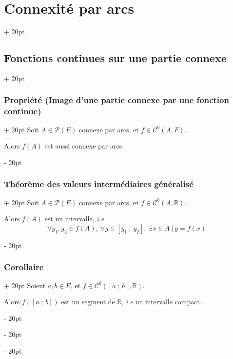 \documentclass[a4paper, 12pt, twoside]{article}
\newcommand{\R}{\mathbb{R}} %
\newcommand{\seg}[2]{\left[ #1\ ;\ #2 \right]}
\newcommand{\lr}[1]{\left( #1 \right)}
\newcommand{\ind}[1][20pt]{\advance\leftskip + #1}
\newcommand{\deind}[1][20pt]{\advance\leftskip - #1}
\newenvironment{indt}[2][20pt]{#2 \par \ind[#1]}{\par \deind} %
\begin{document}
\begin{indt}{\section{Connexité par arcs}}
        \vspace{12pt}
        
        \begin{indt}{\subsection{Fonctions continues sur une partie connexe}}
            \begin{indt}{\subsubsection{Propriété (Image d'une partie connexe par une fonction continue)}}
                Soit $A \in \mathcal P(E)$ connexe par arcs, et $f \in \mathcal C^0(A, F)$.

                \vspace{6pt}
                
                Alors $f(A)$ est aussi connexe par arcs.
            \end{indt}

            \vspace{12pt}
            
            \begin{indt}{\subsubsection{Théorème des valeurs intermédiaires généralisé}}
                Soit $A \in \mathcal P(E)$ connexe par arcs, et $f \in \mathcal C^0(A, \R)$.

                \vspace{6pt}
                
                Alors $f(A)$ est un intervalle, \textit{i.e}
                \[
                    \forall y_1, y_2 \in f(A),\
                    \forall y \in \seg{y_1}{y_2},\
                    \exists x \in A\ |\ y = f(x)
                \]
            \end{indt}

            \vspace{12pt}
            
            \begin{indt}{\subsubsection{Corollaire}}
                Soient $a, b \in E$, et $f \in \mathcal C^0(\seg a b, \R)$.

                Alors $f\!\lr{\seg a b}$ est un segment de $\R$, \textit{i.e} un intervalle compact.
            \end{indt}
        \end{indt}
    \end{indt}
\end{document}
